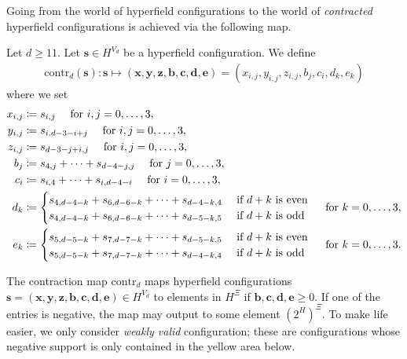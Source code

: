 Going from the world of hyperfield configurations to the world of \emph{contracted} hyperfield configurations is achieved via the following map.

\begin{definition}
    Let \( d \geq 11 \). Let \( \mathbf{s} \in H^{V_d} \) be a hyperfield configuration. We define 
    \begin{align*}
        \mathrm{contr}_d(\mathbf{s}): \mathbf{s} \mapsto (\mathbf{x}, \mathbf{y}, \mathbf{z}, \mathbf{b}, \mathbf{c}, \mathbf{d}, \mathbf{e}) = (x_{i,j}, y_{i,j}, z_{i,j}, b_j, c_i, d_k, e_k)
    \end{align*}
    where we set
    \begin{align*}
        x_{i,j} &\coloneqq s_{i,j} \quad \text{ for } i,j = 0, \dots, 3, \\
        y_{i,j} &\coloneqq s_{i, d-3-i+j} \quad \text{ for } i,j = 0, \dots, 3, \\
        z_{i,j} &\coloneqq s_{d-3-j+i,j} \quad \text{ for } i,j = 0, \dots, 3, \\
        b_j &\coloneqq s_{4,j} + \dots + s_{d-4-j,j} \quad \text{ for } j = 0, \dots, 3, \\
        c_i &\coloneqq s_{i,4} + \dots + s_{i,d-4-i} \quad \text{ for } i = 0, \dots, 3, \\
        d_k &\coloneqq \begin{cases}
            s_{4,d-4-k} + s_{6,d-6-k} + \dots + s_{d-4-k,4} & \text{ if \( d + k \) is even} \\
            s_{4,d-4-k} + s_{6,d-6-k} + \dots + s_{d-5-k,5} & \text{ if \( d + k \) is odd}
        \end{cases} \quad \text{ for } k = 0, \dots, 3, \\
        e_k &\coloneqq \begin{cases}
            s_{5,d-5-k} + s_{7,d-7-k} + \dots + s_{d-5-k,5} & \text{ if \( d + k \) is even} \\
            s_{5,d-5-k} + s_{7,d-7-k} + \dots + s_{d-4-k,4} & \text{ if \( d + k \) is odd}
        \end{cases} \quad \text{ for } k = 0, \dots, 3.
    \end{align*}
\end{definition}

The contraction map \( \mathrm{contr}_d \) maps hyperfield configurations \( \mathbf{s} = (\mathbf{x}, \mathbf{y}, \mathbf{z}, \mathbf{b}, \mathbf{c}, \mathbf{d}, \mathbf{e}) \in H^{{V_d}} \) to elements in \( H^{\Xi} \) if \( \mathbf{b}, \mathbf{c}, \mathbf{d}, \mathbf{e}  \geq 0\). If one of the entries is negative, the map may output to some element \( (2^H)^{\Xi} \). To make life easier, we only consider \emph{weakly valid} configuration; these are configurations whose negative support is only contained in the yellow area below.

